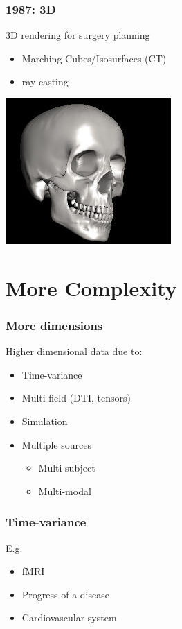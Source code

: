\documentclass{beamer}
\begin{document}
\begin{frame}
	\frametitle{1987: 3D}
	3D rendering for surgery planning
	\begin{itemize}
		\item Marching Cubes/Isosurfaces (CT)
		\item ray casting
	\end{itemize}
	\begin{center}
		\includegraphics[width=.4\textwidth,height=.4\textheight]{images/marching}
	\end{center}
\end{frame}

\section{More Complexity}
\begin{frame}
	\frametitle{More dimensions}
	Higher dimensional data due to:
	\begin{itemize}
		\item Time-variance
		\item Multi-field (DTI, tensors)
		\item Simulation
		\item Multiple sources
			\begin{itemize}
				\item Multi-subject
				\item Multi-modal
			\end{itemize}
	\end{itemize}
\end{frame}

\begin{frame}
	\frametitle{Time-variance}
	E.g.
	\begin{itemize}
		\item fMRI
		\item Progress of a disease
		\item Cardiovascular system
	\end{itemize}
\end{frame}
\end{document}
